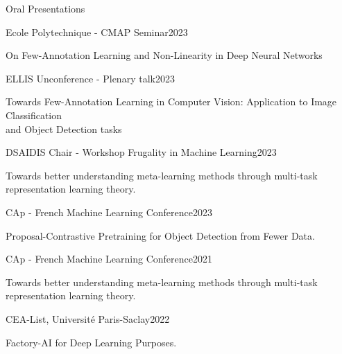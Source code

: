 \documentclass{resume} %
\begin{document}
    
    \begin{rSection}{Oral Presentations}

    \begin{rSubsection}{Ecole Polytechnique - CMAP Seminar}{2023}{}{}
        \item[] On Few-Annotation Learning and Non-Linearity in Deep Neural Networks
    \end{rSubsection}

    \begin{rSubsection}{ELLIS Unconference - Plenary talk}{2023}{}{}
        \item[] Towards Few-Annotation Learning in Computer Vision: Application to Image Classification \\ and Object Detection tasks
    \end{rSubsection}

    \begin{rSubsection}{DSAIDIS Chair - Workshop Frugality in Machine Learning}{2023}{}{}
        \item[] Towards better understanding meta-learning methods through multi-task representation learning theory.
    \end{rSubsection}

    \begin{rSubsection}{CAp - French Machine Learning Conference}{2023}{}{}
            \item[] Proposal-Contrastive Pretraining for Object Detection from Fewer Data.
    \end{rSubsection}
    
    \begin{rSubsection}{CAp - French Machine Learning Conference}{2021}{}{}
            \item[] Towards better understanding meta-learning methods through multi-task representation learning theory.
    \end{rSubsection}

    \begin{rSubsection}{CEA-List, Université Paris-Saclay}{2022}{}{}
        \item[] Factory-AI for Deep Learning Purposes. 
    \end{rSubsection}


\end{rSection}
\end{document}

